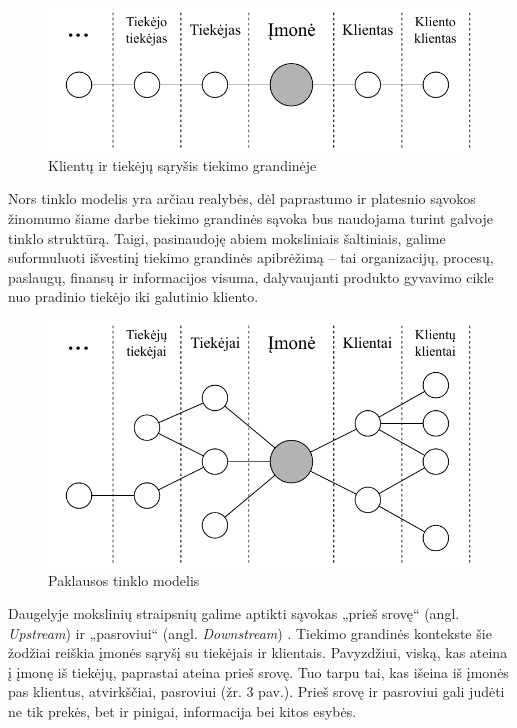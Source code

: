 \begin{figure}[H]
    \centering
    \includegraphics[scale=1]{images/client-supplier-model}
    \caption{Klientų ir tiekėjų sąryšis tiekimo grandinėje}
\end{figure}

Nors tinklo modelis yra arčiau realybės, dėl paprastumo ir platesnio sąvokos žinomumo šiame darbe tiekimo grandinės sąvoka bus naudojama turint galvoje tinklo struktūrą. Taigi, pasinaudoję abiem moksliniais šaltiniais, galime suformuluoti išvestinį tiekimo grandinės apibrėžimą – tai organizacijų, procesų, paslaugų, finansų ir informacijos visuma, dalyvaujanti produkto gyvavimo cikle nuo pradinio tiekėjo iki galutinio kliento.

\begin{figure}[H]
    \centering
    \includegraphics[scale=0.8]{images/demand-network-model}
    \caption{Paklausos tinklo modelis}
\end{figure}

Daugelyje mokslinių straipsnių galime aptikti sąvokas „prieš srovę“ (angl. \textit{Upstream}) ir „pasroviui“ (angl. \textit{Downstream}) \cite{croson2005upstream} \cite{frohlich2001arcs} \cite{vachon2006extending}. Tiekimo grandinės kontekste šie žodžiai reiškia įmonės sąryšį su tiekėjais ir klientais. Pavyzdžiui, viską, kas ateina į įmonę iš tiekėjų, paprastai ateina prieš srovę. Tuo tarpu tai, kas išeina iš įmonės pas klientus, atvirkščiai, pasroviui \cite{christopher2016logistics} (žr. 3 pav.). Prieš srovę ir pasroviui gali judėti ne tik prekės, bet ir pinigai, informacija bei kitos esybės.

